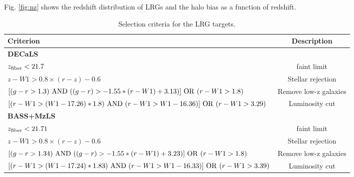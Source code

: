 Fig. \ref{fig:nz} shows the redshift distribution of LRGs and the halo bias as a function of redshift. 



\begin{table}
  \begin{center}
    \caption{Selection criteria for the LRG targets.}
    \label{tab:ts}
    \begin{tabular}{lc}
    \hline
      \textbf{Criterion} &\textbf{Description}\\
      \hline   
     \textbf{DECaLS} & \\ 
     $z_{\rm fiber} < 21.7$  & faint limit  \\
     $z - W1 > 0.8 \times (r - z) - 0.6$ & Stellar rejection  \\
     $[(g-r >1.3)~{\rm AND}~((g-r) > -1.55*(r-W1) + 3.13)]~{\rm OR}~(r -W 1 > 1.8)$ & Remove low-z galaxies \\
     $[(r-W1 > (W1 - 17.26)*1.8)~{\rm AND}~(r - W1 > W1 - 16.36)]~{\rm OR}~(r-W1 > 3.29)$ & Luminosity cut \\ 
    \hline
     \textbf{BASS+MzLS} & \\ 
     $z_{\rm fiber} < 21.71$  & faint limit  \\
     $z - W1 > 0.8 \times (r - z) - 0.6$ & Stellar rejection  \\
     $[(g-r >1.34)~{\rm AND}~((g-r) > -1.55*(r-W1) + 3.23)]~{\rm OR}~(r -W 1 > 1.8)$ & Remove low-z galaxies \\
     $[(r-W1 > (W1 - 17.24)*1.83)~{\rm AND}~(r - W1 > W1 - 16.33)]~{\rm OR}~(r-W1 > 3.39)$ & Luminosity cut \\ 
      \hline
      \end{tabular}
  \end{center}
\end{table}